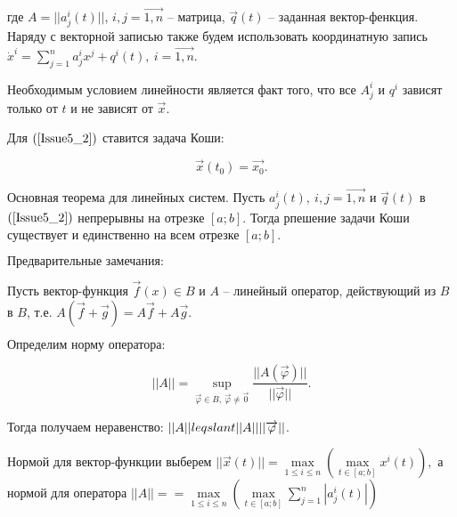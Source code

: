 где $A = ||a_j^i(t)||$, $i,j = \overrightarrow{1,n}$ -- матрица, $\overrightarrow{q}(t)$ -- заданная вектор-фенкция. Наряду с векторной записью также будем использовать координатную запись $\dot{x}^i = \sum\limits_{j = 1}^{n} a_j^i x^j + q^i(t),\ i = \overrightarrow{1,n}$.

$\textbf{Необходимым условием линейности}$ является факт того, что все $A_j^i$ и $q^i$ зависят только от $t$ и не зависят от $\overrightarrow{x}$.

Для $(\ref{Issue5_2})$ ставится задача Коши:

\[ \overrightarrow{x}(t_0) = \overrightarrow{x_0}.\]

\begin{theorem}

$\textbf{Основная теорема для линейных систем.}$ Пусть $a_j^i(t),\ i,j = \overrightarrow{1,n}$ и $\overrightarrow{q}(t)$ в $(\ref{Issue5_2})$ непрерывны на отрезке $[a;b]$. Тогда рпешение задачи Коши существует и единственно на всем отрезке $[a;b].$

\end{theorem}

$\textbf{Предварительные замечания:}$

Пусть вектор-функция $\overrightarrow{f}(x) \in B$ и $A$ -- линейный оператор, действующий из $B$ в $B$, т.е. $A(\overrightarrow{f} + \overrightarrow{g}) = A\overrightarrow{f} + A\overrightarrow{g}$.

$\textbf{Определим норму оператора:}$

\[ ||A|| =  \sup\limits_{\overrightarrow{\varphi} \in B,\ \overrightarrow{\varphi} \neq \overrightarrow{0}} \frac{||A(\overrightarrow{\varphi})||}{||\overrightarrow{\varphi}||}. \]

Тогда получаем неравенство: $||A|| \\leqslant ||A||||\overrightarrow{\varphi}||$.

Нормой для вектор-функции выберем $||\overrightarrow{x}(t)|| = \max\limits_{1 \leqslant i \leqslant n} (\max\limits_{t \in [a;b]} x^i(t)),$ а нормой для оператора $||A|| = = \max\limits_{1 \leqslant i \leqslant n} (\max\limits_{t \in [a;b]} \sum\limits_{j = 1}^{n} |a_j^i(t)|)$

